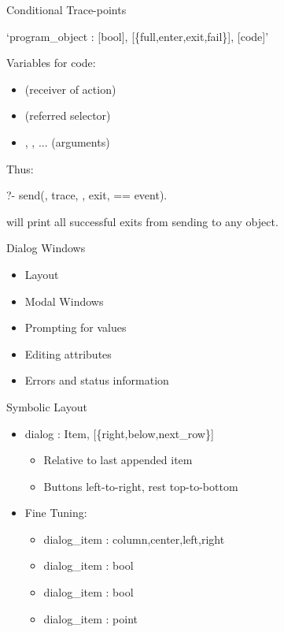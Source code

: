 \begin{sli}{Conditional Trace-points}

`program_object : [bool], [\{full,enter,exit,fail\}], [code]'

Variables for code:

\begin{itemize}
    \item {} (receiver of action)
    \item {} (referred selector)
    \item {}, , ... (arguments)
\end{itemize}

Thus:

?- send(, trace, , exit,  == event).

will print all successful exits from sending  to any object.
\end{sli}



\begin{sli}{Dialog Windows}
\begin{itemize}
    \item Layout
    \item Modal Windows
    \item Prompting for values
    \item Editing attributes
    \item Errors and status information
\end{itemize}
\end{sli}


\begin{sli}{Symbolic Layout}

\begin{itemize}
    \item dialog : Item, [\{right,below,next_row\}]
    \begin{itemize}
        \item Relative to last appended item
	\item Buttons left-to-right, rest top-to-bottom
    \end{itemize}
    \item Fine Tuning:
    \begin{itemize}
        \item dialog_item : {column,center,left,right}
	\item dialog_item : bool
	\item dialog_item : bool
	\item dialog_item : point
    \end{itemize}
\end{itemize}
\end{sli}


